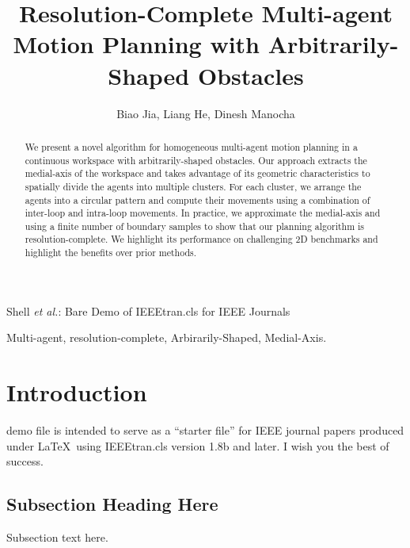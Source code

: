 \documentclass[journal]{IEEEtran}
\begin{document}
\title{Resolution-Complete Multi-agent Motion Planning with Arbitrarily-Shaped Obstacles}

\author{Biao Jia, Liang He, Dinesh Manocha}%


%
{Shell \MakeLowercase{\textit{et al.}}: Bare Demo of IEEEtran.cls for IEEE Journals}


\maketitle

\begin{abstract}
We present a novel algorithm for homogeneous multi-agent motion planning in a continuous workspace with arbitrarily-shaped obstacles. Our approach  extracts the medial-axis of the workspace and takes advantage of its geometric characteristics to spatially divide the agents into multiple clusters. For each cluster, we arrange the  agents into a circular pattern and compute their movements using a combination of inter-loop and intra-loop movements. In practice, we approximate the medial-axis and using a finite number of boundary samples to show that our planning algorithm is resolution-complete. We highlight its performance on challenging 2D benchmarks and highlight the benefits over prior methods.
\end{abstract}

\begin{IEEEkeywords}
Multi-agent, resolution-complete, Arbirarily-Shaped, Medial-Axis.
\end{IEEEkeywords}

\IEEEpeerreviewmaketitle

\section{Introduction}
 demo file is intended to serve as a ``starter file''
for IEEE journal papers produced under \LaTeX\ using
IEEEtran.cls version 1.8b and later.
I wish you the best of success.

\subsection{Subsection Heading Here}
Subsection text here.
\end{document}
